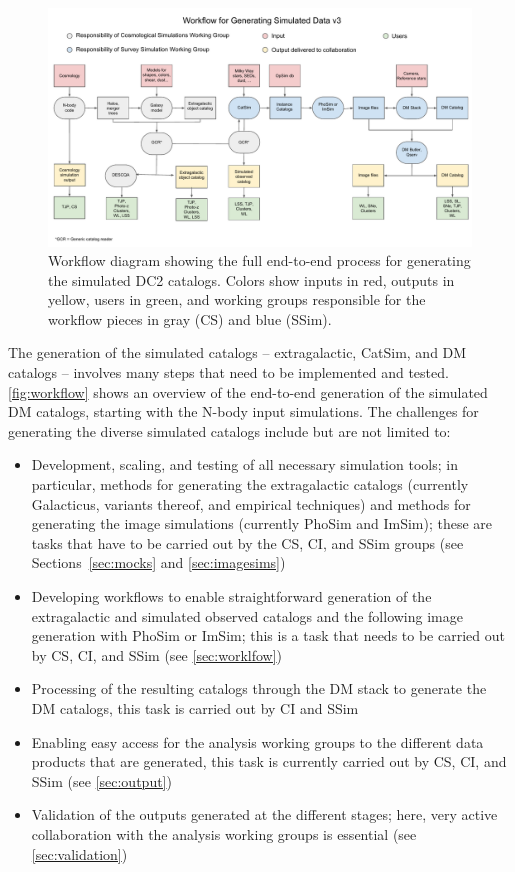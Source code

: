 \documentclass[preprint,times]{aastex61}
\begin{document}
\begin{figure}[!htb]
\includegraphics[width=1\textwidth]{Catalog_Simulation_Workflow}
\caption{\label{fig:workflow}Workflow diagram showing the full end-to-end process for generating the simulated DC2 catalogs. Colors show inputs in red, outputs in yellow, users in green, and working groups responsible for the workflow pieces in gray (CS) and blue (SSim).}
\end{figure}

The generation of the simulated catalogs -- extragalactic, CatSim, and DM catalogs -- involves many steps that need to be implemented and tested. \autoref{fig:workflow} shows an overview of the end-to-end generation of the simulated DM catalogs, starting with the N-body input simulations. The challenges for generating the diverse simulated catalogs include but are not limited to:
\begin{itemize}
\item Development, scaling, and testing of all necessary simulation tools; in particular, methods for generating the extragalactic catalogs (currently Galacticus, variants thereof, and empirical techniques) and methods for generating the image simulations (currently PhoSim and ImSim); these are tasks that have to be carried out by the CS, CI, and SSim groups (see Sections~\ref{sec:mocks} and \ref{sec:imagesims})
\item Developing workflows to enable straightforward generation of the extragalactic and simulated observed catalogs and the following image generation with PhoSim or ImSim; this is a task that needs to be carried out by CS, CI, and SSim (see \autoref{sec:worklfow})
\item Processing of the resulting catalogs through the DM stack to generate the DM catalogs, this task is carried out by CI and SSim
\item Enabling easy access for the analysis working groups to the different data products that are generated, this task is currently carried out by CS, CI, and SSim (see \autoref{sec:output})
\item Validation of the outputs generated at the different stages; here, very active collaboration with the analysis working groups is essential (see \autoref{sec:validation})
\end{itemize}
\end{document}
